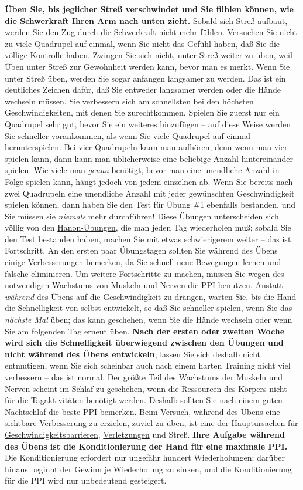 \textbf{Üben Sie, bis jeglicher Streß verschwindet und Sie fühlen können, wie die Schwerkraft Ihren Arm nach unten zieht.}
Sobald sich Streß aufbaut, werden Sie den Zug durch die Schwerkraft nicht mehr fühlen.
Versuchen Sie nicht zu viele Quadrupel auf einmal, wenn Sie nicht das Gefühl haben, daß Sie die völlige Kontrolle haben.
Zwingen Sie sich nicht, unter Streß weiter zu üben, weil Üben unter Streß zur Gewohnheit werden kann, bevor man es merkt.
Wenn Sie unter Streß üben, werden Sie sogar anfangen langsamer zu werden.
Das ist ein deutliches Zeichen dafür, daß Sie entweder langsamer werden oder die Hände wechseln müssen.
Sie verbessern sich am schnellsten bei den höchsten Geschwindigkeiten, mit denen Sie zurechtkommen.
Spielen Sie zuerst nur ein Quadrupel sehr gut, bevor Sie ein weiteres hinzufügen -- auf diese Weise werden Sie schneller vorankommen, als wenn Sie viele Quadrupel auf einmal herunterspielen.
Bei vier Quadrupeln kann man aufhören, denn wenn man vier spielen kann, dann kann man üblicherweise eine beliebige Anzahl hintereinander spielen.
Wie viele man \textit{genau} benötigt, bevor man eine unendliche Anzahl in Folge spielen kann, hängt jedoch von jedem einzelnen ab.
Wenn Sie bereits nach zwei Quadrupeln eine unendliche Anzahl mit jeder gewünschten Geschwindigkeit spielen können, dann haben Sie den Test für Übung \#1 ebenfalls bestanden, und Sie müssen sie \textit{niemals} mehr durchführen!
Diese Übungen unterscheiden sich völlig von den \hyperref[c1iii7h]{Hanon-Übungen}, die man jeden Tag wiederholen muß; sobald Sie den Test bestanden haben, machen Sie mit etwas schwierigerem weiter -- das ist Fortschritt.
An den ersten paar Übungstagen sollten Sie während des Übens einige Verbesserungen bemerken, da Sie schnell neue Bewegungen lernen und falsche eliminieren.
Um weitere Fortschritte zu machen, müssen Sie wegen des notwendigen Wachstums von Muskeln und Nerven die \hyperref[c1ii15]{PPI} benutzen.
Anstatt \textit{während} des Übens auf die Geschwindigkeit zu drängen, warten Sie, bis die Hand die Schnelligkeit von selbst entwickelt, so daß Sie schneller spielen, wenn Sie das \textit{nächste Mal} üben; das kann geschehen, wenn Sie die Hände wechseln oder wenn Sie am folgenden Tag erneut üben.
\textbf{Nach der ersten oder zweiten Woche wird sich die Schnelligkeit überwiegend zwischen den Übungen und nicht während des Übens entwickeln}; lassen Sie sich deshalb nicht entmutigen, wenn Sie sich scheinbar auch nach einem harten Training nicht viel verbessern -- das ist normal.
Der größte Teil des Wachstums der Muskeln und Nerven scheint im Schlaf zu geschehen, wenn die Ressourcen des Körpers nicht für die Tagaktivitäten benötigt werden.
Deshalb sollten Sie nach einem guten Nachtschlaf die beste PPI bemerken.
Beim Versuch, während des Übens eine sichtbare Verbesserung zu erzielen, zuviel zu üben, ist eine der Hauptursachen für \hyperref[c1iv2b]{Geschwindigkeitsbarrieren}, \hyperref[c1iii10hand]{Verletzungen} und Streß.
\textbf{Ihre Aufgabe während des Übens ist die Konditionierung der Hand für eine maximale PPI.}
Die Konditionierung erfordert nur ungefähr hundert Wiederholungen; darüber hinaus beginnt der Gewinn je Wiederholung zu sinken, und die Konditionierung für die PPI wird nur unbedeutend gesteigert.

